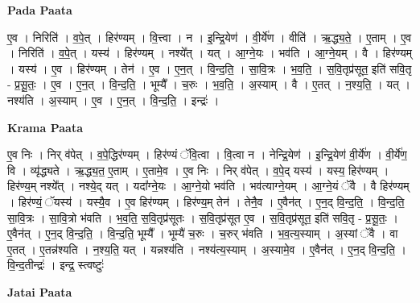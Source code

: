 \documentclass[17pt]{extarticle}
\begin{document}
\textbf{Pada Paata} \newline

ए॒व । निरिति॑ । व॒पे॒त् । हिर॑ण्यम् । वि॒त्त्वा । न । इ॒न्द्रि॒येण॑ । वी॒र्ये॑ण । वीति॑ । ऋ॒द्ध्य॒ते॒ । ए॒ताम् । ए॒व । निरिति॑ । व॒पे॒त् । यस्य॑ । हिर॑ण्यम् । नश्ये᳚त् । यत् । आ॒ग्ने॒यः । भव॑ति । आ॒ग्ने॒यम् । वै । हिर॑ण्यम् । यस्य॑ । ए॒व । हिर॑ण्यम् । तेन॑ । ए॒व । ए॒न॒त् । वि॒न्द॒ति॒ । सा॒वि॒त्रः । भ॒व॒ति॒ । स॒वि॒तृप्र॑सूत॒ इति॑ सवि॒तृ - प्र॒सू॒तः॒ । ए॒व । ए॒न॒त् । वि॒न्द॒ति॒ । भूम्यै᳚ । च॒रुः । भ॒व॒ति॒ । अ॒स्याम् । वै । ए॒तत् । न॒श्य॒ति॒ । यत् । नश्य॑ति । अ॒स्याम् । ए॒व । ए॒न॒त् । वि॒न्द॒ति॒ । इन्द्रः॑ ।  \newline


\textbf{Krama Paata} \newline

ए॒व निः । निर् व॑पेत् । व॒पे॒द्धिर॑ण्यम् । हिर॑ण्यं ॅवि॒त्वा । वि॒त्वा न । नेन्द्रि॒येण॑ । इ॒न्द्रि॒येण॑ वी॒र्ये॑ण । वी॒र्ये॑ण॒ वि । व्यृ॑द्ध्यते । ऋ॒द्ध्य॒त॒ ए॒ताम् । ए॒तामे॒व । ए॒व निः । निर् व॑पेत् । व॒पे॒द् यस्य॑ । यस्य॒ हिर॑ण्यम् । हिर॑ण्य॒म् नश्ये᳚त् । नश्ये॒द् यत् । यदा᳚ग्ने॒यः । आ॒ग्ने॒यो भव॑ति । भव॑त्याग्ने॒यम् । आ॒ग्ने॒यं ॅवै । वै हिर॑ण्यम् । हिर॑ण्यं॒ ॅयस्य॑ । यस्यै॒व । ए॒व हिर॑ण्यम् । हिर॑ण्य॒म् तेन॑ । तेनै॒व । ए॒वैन॑त् । ए॒न॒द् वि॒न्द॒ति॒ । वि॒न्द॒ति॒ सा॒वि॒त्रः । सा॒वि॒त्रो भ॑वति । भ॒व॒ति॒ स॒वि॒तृप्र॑सूतः । स॒वि॒तृप्र॑सूत ए॒व । स॒वि॒तृप्र॑सूत॒ इति॑ सवि॒तृ - प्र॒सू॒तः॒ । ए॒वैन॑त् । ए॒न॒द् वि॒न्द॒ति॒ । वि॒न्द॒ति॒ भूम्यै᳚ । भूम्यै॑ च॒रुः । च॒रुर् भ॑वति । भ॒व॒त्य॒स्याम् । अ॒स्यां ॅवै । वा ए॒तत् । ए॒तन्न॑श्यति । न॒श्य॒ति॒ यत् । यन्नश्य॑ति । नश्य॑त्य॒स्याम् । अ॒स्यामे॒व । ए॒वैन॑त् । ए॒न॒द् वि॒न्द॒ति॒ । वि॒न्द॒तीन्द्रः॑ । इन्द्र॒ स्त्वष्टुः॑ \newline

\textbf{Jatai Paata} \newline
\end{document}
